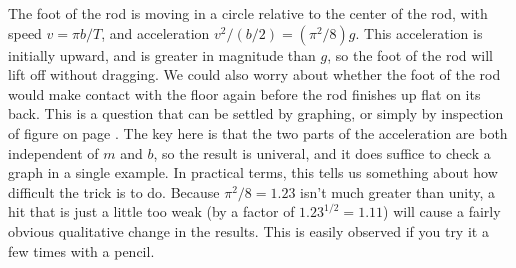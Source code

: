 The foot of the rod is moving in a circle relative to the center of the rod,
with speed $v=\pi b/T$, and acceleration $v^2/(b/2)=(\pi^2/8)g$. This acceleration
is initially upward, and is greater in magnitude than $g$, so the foot of the rod
will lift off without dragging. We could also worry about whether the foot of the
rod would make contact with the floor again before the rod finishes up flat on its
back. This is a question that can be settled by graphing, or simply by inspection
of figure  on page \pageref{fig:eg-toppling-rod}. The key here
is that the two parts of the acceleration are both independent of $m$ and $b$, so
the result is univeral, and it does suffice to check a graph in a single example.
In practical terms, this tells us something about how difficult the trick is to
do. Because $\pi^2/8=1.23$ isn't much greater than unity, a hit that is just a
little too weak (by a factor of $1.23^{1/2}=1.11$) will cause
a fairly obvious qualitative change in the results. This is easily observed
if you try it a few times with a pencil.
	


